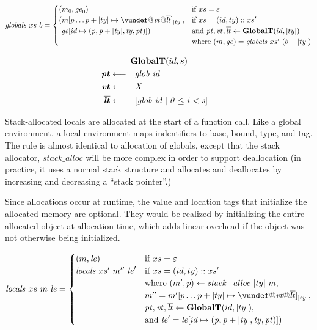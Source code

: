 \documentclass{article}
\begin{document}

\[\mathit{globals} ~ xs ~ b =
\begin{cases}
  (\mem_0, \genv_0) & \textnormal{if } xs = \varepsilon \\
  (\mem[p \dots p+|ty| \mapsto \vundef@\vt@\overline{\lt}]_{|ty|}, & \textnormal{if } xs = (id,ty)::xs' \\
  ~ \genv[id \mapsto (\mathit{p, p+|ty|,ty,\pt})]) & \textnormal{and } \trule{\pt,\vt,\overline{\lt}}{\globalt{id}{|ty|}} \\
  & \textnormal{where } (\mem,\genv) = \mathit{globals} ~ xs' ~ (b + |ty|) \\
\end{cases}\]

\[\begin{aligned}
\truledef{\globalt{id}{s}}
\settag{\pt}{\mathit{glob ~ id}}
\settag{\vt}{X}
\settag{\overline{\lt}}{\left[\mathit{glob} ~ id \mid 0 \leq i < s\right]}
\end{aligned}\]

Stack-allocated locals are allocated at the start of a function call. Like a global environment,
a local environment maps indentifiers to base, bound, type, and tag. The rule is almost identical
to allocation of globals, except that the stack allocator, \(\mathit{stack\_alloc}\) will be more
complex in order to support deallocation (in practice, it uses a normal stack structure and allocates
and deallocates by increasing and decreasing a ``stack pointer''.)

Since allocations occur at runtime, the value and location tags that initialize the allocated memory
are optional. They would be realized by initializing the entire allocated object at allocation-time,
which adds linear overhead if the object was not otherwise being initialized.

\[\mathit{locals} ~ xs ~ \mem ~ \lenv =
\begin{cases}
  (\mem, \lenv) & \textnormal{if } xs = \varepsilon \\
  \mathit{locals} ~ xs' ~ \mem'' ~ \lenv' & \textnormal{if } xs = (id,ty)::xs' \\
  & \textnormal{where } (\mem',p) \leftarrow \mathit{stack\_alloc} ~ |ty| ~ \mem, \\
  & \mem'' = \mem'[p \dots p+|ty| \mapsto \vundef@\vt@\overline{\lt}]_{|ty|}, \\
  & \trule{\pt,\vt,\overline{\lt}}{\globalt{id}{|ty|}}, \\
  & \textnormal{and } \lenv' = \lenv[id \mapsto (\mathit{p, p+|ty|,ty,\pt})]) \\
\end{cases}\]
              
\end{document}
